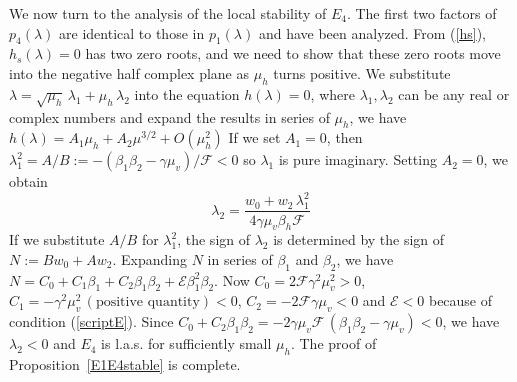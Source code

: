 \documentclass[12pt,leqno]{article}
\begin{document}
We now turn to the analysis of the local stability of $E_4$. The first two factors of $p_4(\lambda)$ are identical to those in $p_1(\lambda)$ and have been analyzed. From (\ref{hs}), $h_s(\lambda) = 0$ has two zero roots, and we need to show that these zero roots move into the negative half complex plane as $\mu_h$ turns positive. We substitute $\lambda = \sqrt{\mu_h}\,\lambda_1 + \mu_h\,\lambda_2$ into the equation $h(\lambda)=0$, where $\lambda_1, \lambda_2$ can be any real or complex numbers and expand the results in series of $\mu_h$, we have $h(\lambda) = A_1\mu_h + A_2\mu^{3/2}+ O(\mu_h^2)$ If we set $A_1=0$, then $\lambda_1^2 = A/B := -(\beta_1\beta_2-\gamma\mu_v)/\mathcal{F}< 0$ so $\lambda_1$ is pure imaginary. Setting $A_2=0$, we obtain 
$$
\lambda_2 = \frac{w_0 + w_2\,\lambda_1^2}{4\gamma\mu_v\beta_h\mathcal{F}}
$$ 
If we substitute $A/B$ for $\lambda_1^2$, the sign of $\lambda_2$ is determined by the sign of $N := Bw_0 + Aw_2$. Expanding $N$ in series of $\beta_1$ and $\beta_2$, we have $N = C_0 + C_{1}\beta_1 + C_{2}\beta_1\beta_2 + \mathcal{E}\beta_1^2\beta_2$. Now $C_ 0 = 2\mathcal{F}\gamma^2\mu_v^2 > 0$, $C_{1} = -\gamma^2\mu_v^2\,(\mbox{positive quantity})<0$, $C_{2} = -2\mathcal{F}\gamma\mu_v<0$ and $\mathcal{E} < 0$ because of condition (\ref{scriptE}). Since $C_0+C_{2}\beta_1\beta_2 = -2\gamma\mu_v\mathcal{F}\,(\beta_1\beta_2-\gamma\mu_v) < 0$, we have $\lambda_2 < 0$ and
$E_4$ is l.a.s. for sufficiently small $\mu_h$. The proof of Proposition~\ref{E1E4stable} is complete.
\end{document}
